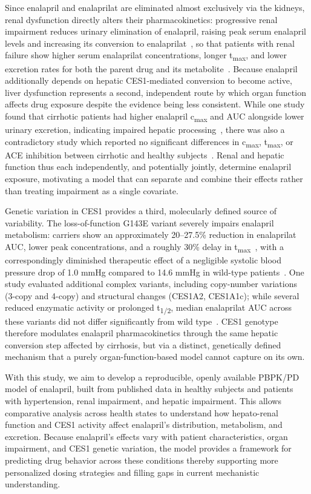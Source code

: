 \documentclass[pharmaceutics,article,submit,pdftex,moreauthors]{Definitions/mdpi}
\begin{document}
Since enalapril and enalaprilat are eliminated almost exclusively via the kidneys, renal dysfunction directly alters their pharmacokinetics: progressive renal impairment reduces urinary elimination of enalapril, raising peak serum enalapril levels and increasing its conversion to enalaprilat~\cite{Fruncillo1987}, so that patients with renal failure show higher serum enalaprilat concentrations, longer t\textsubscript{max}, and lower excretion rates for both the parent drug and its metabolite~\cite{Kelly1986, Lowenthal1985}. Because enalapril additionally depends on hepatic CES1-mediated conversion to become active, liver dysfunction represents a second, independent route by which organ function affects drug exposure despite the evidence being less consistent. While one study found that cirrhotic patients had higher enalapril c\textsubscript{max} and AUC alongside lower urinary excretion, indicating impaired hepatic processing~\cite{Ohnishi1989}, there was also a contradictory study which reported no significant differences in c\textsubscript{max}, t\textsubscript{max}, or ACE inhibition between cirrhotic and healthy subjects~\cite{Baba1990}. Renal and hepatic function thus each independently, and potentially jointly, determine enalapril exposure, motivating a model that can separate and combine their effects rather than treating impairment as a single covariate.

Genetic variation in CES1 provides a third, molecularly defined source of variability. The loss-of-function G143E variant severely impairs enalapril metabolism: carriers show an approximately 20--27.5\% reduction in enalaprilat AUC, lower peak concentrations, and a roughly 30\% delay in t\textsubscript{max}~\cite{Her2021, Tarkiainen2015}, with a correspondingly diminished therapeutic effect of a negligible systolic blood pressure drop of 1.0 mmHg compared to 14.6 mmHg in wild-type patients~\cite{Her2021}. One study evaluated additional complex variants, including copy-number variations (3-copy and 4-copy) and structural changes (CES1A2, CES1A1c); while several reduced enzymatic activity or prolonged t\textsubscript{1/2}, median enalaprilat AUC across these variants did not differ significantly from wild type~\cite{Stage2017}. CES1 genotype therefore modulates enalapril pharmacokinetics through the same hepatic conversion step affected by cirrhosis, but via a distinct, genetically defined mechanism that a purely organ-function-based model cannot capture on its own.

With this study, we aim to develop a reproducible, openly available PBPK/PD model of enalapril, built from published data in healthy subjects and patients with hypertension, renal impairment, and hepatic impairment. This allows comparative analysis across health states to understand how hepato-renal function and CES1 activity affect enalapril's distribution, metabolism, and excretion. Because enalapril's effects vary with patient characteristics, organ impairment, and CES1 genetic variation, the model provides a framework for predicting drug behavior across these conditions thereby supporting more personalized dosing strategies and filling gaps in current mechanistic understanding. 
\end{document}
